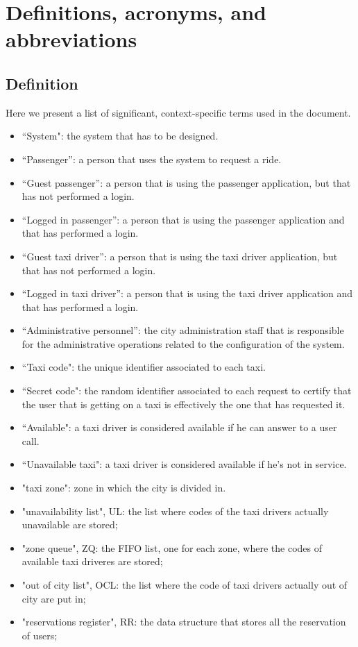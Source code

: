 \section{Definitions, acronyms, and abbreviations}
\subsection{Definition}
Here we present a list of significant, context-specific terms used in the document.
\begin{itemize}
\item “System": the system that has to be designed. 
\item “Passenger”: a person that uses the system to request a ride.
\item “Guest passenger”: a person that is using the passenger application, but that has not performed a login. 
\item “Logged in passenger”: a person that is using the passenger application and that has performed a login. 
\item “Guest taxi driver”: a person that is using the taxi driver application, but that has not performed a login. 
\item “Logged in taxi driver”: a person that is using the taxi driver application and that has performed a login. 
\item “Administrative personnel”: the city administration staff that is responsible for the administrative operations related to the configuration of the system.
\item “Taxi code": the unique identifier associated to each taxi.
\item “Secret code": the random identifier associated to each request to certify that the user that is getting on a taxi is effectively the one that has requested it.
\item “Available": a taxi driver is considered available if he can answer to a user call.
\item “Unavailable taxi":  a taxi driver is considered available if he’s not in service.
\item "taxi zone": zone in which the city is divided in.
\item "unavailability list", UL: the list where codes of the taxi drivers actually unavailable are stored;
\item "zone queue", ZQ: the FIFO list, one for each zone, where the codes of available taxi driveres are stored;
\item "out of city list", OCL: the list where the code of taxi drivers actually out of city are put in;
\item "reservations register", RR: the data structure that stores all the reservation of users;
\end{itemize}


